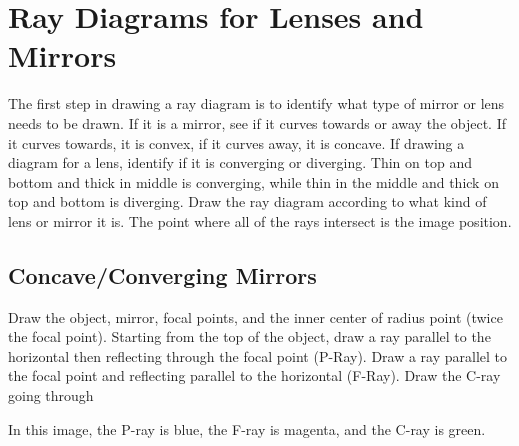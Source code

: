 \documentclass{article}
\begin{document}
\section{Ray Diagrams for Lenses and Mirrors}
The first step in drawing a ray diagram is to identify what type of mirror or lens needs to be drawn.  If it is a mirror, see if it curves towards or away the object.  If it curves towards, it is convex, if it curves away, it is concave.  If drawing a diagram for a lens, identify if it is converging or diverging.  Thin on top and bottom and thick in middle is converging, while thin in the middle and thick on top and bottom is diverging.  Draw the ray diagram according to what kind of lens or mirror it is.  The point where all of the rays intersect is the image position.
\subsection{Concave/Converging Mirrors}
Draw the object, mirror, focal points, and the inner center of radius point (twice the focal point). Starting from the top of the object, draw a ray parallel to the horizontal then reflecting through the focal point (P-Ray).  Draw a ray parallel to the focal point and reflecting parallel to the horizontal (F-Ray).  Draw the C-ray going through 
\newline
{}
\newline
In this image, the P-ray is blue, the F-ray is magenta, and the C-ray is green.
\end{document}
